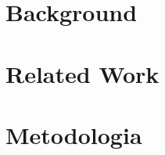 \documentclass[14pt]{extreport}
\begin{document}
\chapter{Background}


\chapter{Related Work}


\chapter{Metodologia}


%


\end{document}
